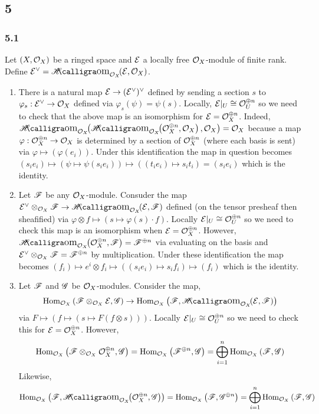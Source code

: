 \documentclass[12pt]{article}
\begin{document}
\subsection{5}

\subsubsection{5.1}

Let $(X, \mathcal{O}_{X})$ be a ringed space and $\mathcal{E}$ a locally free $\mathcal{O}_{X}$-module of finite rank. Define $\E^\vee = \shHom{\struct{X}}{\E}{\struct{X}}$. 

\begin{enumerate}
\item There is a natural map $\mathcal{E} \to (\mathcal{E}^\vee)^\vee$ defined by sending a section $s$ to $\varphi_s : \mathcal{E}^\vee \to \mathcal{O}_{X}$ defined via $\varphi_s(\psi) = \psi(s)$. Locally,  $\mathcal{E}|_U \cong \mathcal{O}_{U}^{\oplus n}$ so we need to check that the above map is an isomorphism for $\mathcal{E} = \mathcal{O}_{X}^{\oplus n}$. Indeed, $\shHom{\struct{X}}{\shHom{\struct{X}}{\struct{X}^{\oplus n}}{\struct{X}}}{\struct{X}} = \struct{X}$ because a map $\varphi : \mathcal{O}_{X}^{\oplus n} \to \mathcal{O}_{X}$ is determined by a section of $\mathcal{O}_{X}^{\oplus n}$ (where each basis is sent) via $\varphi \mapsto (\varphi(e_i))$. Under this identification the map in question becomes $(s_i e_i) \mapsto (\psi \mapsto \psi(s_i e_i)) \mapsto ((t_i e_i) \mapsto s_i t_i) = (s_i e_i)$ which is the identity. 

\item Let $\mathscr{F}$ be any $\mathcal{O}_{X}$-module. Consuder the map $\E^\vee \otimes_{\struct{X}} \F \to \shHom{\struct{X}}{\E}{\F}$ defined (on the tensor presheaf then sheafified) via $\varphi \otimes f \mapsto (s \mapsto \varphi(s) \cdot f)$. Locally $\mathcal{E}|_U \cong \mathcal{O}_{U}^{\oplus n}$ so we need to check this map is an isomorphism when $\mathcal{E} = \mathcal{O}_{X}^{\oplus n}$. However, $\shHom{\struct{X}}{\struct{X}^{\oplus n}}{\F} = \F^{\oplus n}$ via evaluating on the basis and $\mathcal{E}^\vee \otimes_{\mathcal{O}_{X}} \mathscr{F} = \mathscr{F}^{\oplus n}$ by multiplication. Under these identification the map becomes $(f_i) \mapsto e^i \otimes f_i \mapsto ((s_i e_i) \mapsto s_i f_i) \mapsto (f_i)$ which is the identity. 

\item Let $\mathscr{F}$ and $\mathscr{G}$ be $\mathcal{O}_{X}$-modules. Consider the map,
\[ \Hom{\struct{X}}{\F \otimes_{\struct{X}} \E}{\G} \to \Hom{\struct{X}}{\F}{\shHom{\struct{X}}{\E}{\F}} \]
via $F \mapsto (f \mapsto (s \mapsto F(f \otimes s)))$. Locally $\mathcal{E}|_U \cong \mathcal{O}_{U}^{\oplus n}$ so we need to check this for $\mathcal{E} = \mathcal{O}_{X}^{\oplus n}$. However,
\[ \mathrm{Hom}_{\mathcal{O}_{X}} \left( \mathscr{F} \otimes_{\mathcal{O}_{X}} \mathcal{O}_{X}^{\oplus n}, \mathscr{G} \right) = \mathrm{Hom}_{\mathcal{O}_{X}} \left( \mathscr{F}^{\oplus n}, \mathscr{G} \right) = \bigoplus_{i = 1}^n \mathrm{Hom}_{\mathcal{O}_{X}} \left( \mathscr{F}, \mathscr{G} \right) \]
Likewise,
\[ \Hom{\struct{X}}{\F}{\shHom{\struct{X}}{\struct{X}^{\oplus n}}{\G}} = \Hom{\struct{X}}{\F}{\G^{\oplus n}} = \bigoplus_{i = 1}^n \Hom{\struct{X}}{\F}{\G} \]


\end{enumerate}
\end{document}
